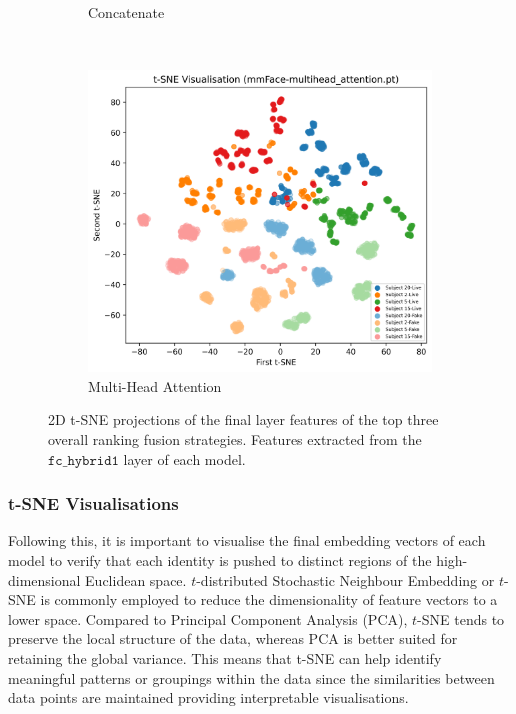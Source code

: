 \documentclass{mpaper}
\begin{document}
\begin{figure}[!t]
\begin{subfigure}[b]{0.32\textwidth}
        \caption{Concatenate}
        \label{fig:tsne_concatenate}
    \end{subfigure}
    ~\hspace{0.01cm}
    \begin{subfigure}[b]{0.32\textwidth}
        \includegraphics[width=1.06\textwidth]{figures/tsne_multihead_attention.png}
        \caption{Multi-Head Attention}
        \label{fig:tsne_multihead_attention}
    \end{subfigure}
    \vspace{0.3cm}
    \caption{2D t-SNE projections of the final layer features of the top three overall ranking fusion strategies. Features extracted from the $\mathtt{fc\_hybrid1}$ layer of each model.}
    \vspace{-0.4cm}
\end{figure}

\subsubsection{t-SNE Visualisations}
Following this, it is important to visualise the final embedding vectors of each model to verify that each identity is pushed to distinct regions of the high-dimensional Euclidean space. $t$-distributed Stochastic Neighbour Embedding or $t$-SNE \cite{van2008visualizing} is commonly employed to reduce the dimensionality of  feature vectors to a lower space. Compared to Principal Component Analysis (PCA), $t$-SNE tends to preserve the local structure of the data, whereas PCA is better suited for retaining the global variance. This means that t-SNE can help identify meaningful patterns or groupings within the data since the similarities between data points are maintained providing interpretable visualisations.
\end{document}
